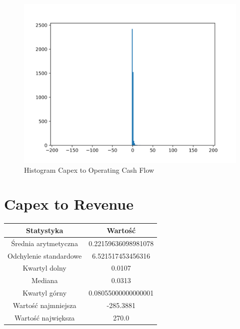 \documentclass{article}
\begin{document}
\begin{figure}[h!]
    \includegraphics[width=\linewidth]{variables/Capex to Operating Cash Flow.png}
    \caption{Histogram Capex to Operating Cash Flow }
\end{figure}\section{ Capex to Revenue }

\begin{center}
    \begin{tabular}{|c | c|} 
    \hline
    Statystyka & Wartość \\
    \hline\hline
    Średnia arytmetyczna & 0.22159636098981078 \\ 
    \hline
    Odchylenie standardowe & 6.521517453456316 \\
    \hline
    Kwartyl dolny & 0.0107 \\
    \hline
    Mediana & 0.0313 \\
    \hline
    Kwartyl górny & 0.08055000000000001 \\
    \hline
    Wartość najmniejsza & -285.3881 \\
    \hline
    Wartość największa & 270.0 \\
    \hline
   \end{tabular}
\end{center}
\end{document}
